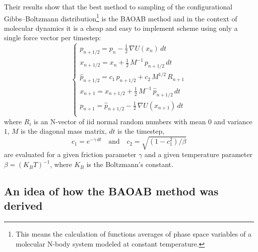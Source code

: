 \documentclass[10pt,a4paper]{article}
\begin{document}
Their results show that the best method to sampling of the configurational Gibbs–Boltzmann distribution\footnote{This means the calculation of functions averages of phase space variables of a molecular N-body system modeled at constant temperature.} is the BAOAB method and in the context of molecular dynamics it is a cheap and easy to implement scheme using only a single force vector per timestep:
\[
\begin{cases}
 p_{n+1/2}=p_n-\frac{1}{2}\,\nabla U\left(x_n\right)\,dt \\
 x_{n+1/2}=x_n+\frac{1}{2}\,M^{-1}\,p_{n+1/2}\,dt \\
 \hat{p}_{n+1/2}=c_1\,p_{n+1/2}+c_2\,M^{1/2}\,R_{n+1} \\ 
 x_{n+1}=x_{n+1/2}+\frac{1}{2}\,M^{-1}\,\hat{p}_{n+1/2}\,dt \\
 p_{n+1}=\hat{p}_{n+1/2}-\frac{1}{2}\,\nabla U\left(x_{n+1}\right)\,dt \\
\end{cases}
\]
where $R_i$ is an N-vector of iid normal random numbers with mean $0$ and variance $1$, $M$ is the diagonal mass matrix, $dt$ is the timestep, 
\[ c_1=e^{-\gamma\,dt}\quad\text{and}\quad c_2=\sqrt{\left(1-c_1^2\right)/\beta}  \] are evaluated for a given friction parameter $\gamma$ and a given temperature parameter $\beta=(K_BT)^{-1}$, where $K_B$ is the Boltzmann's constant.


\subsection{An idea of how the BAOAB method was derived}
\end{document}
